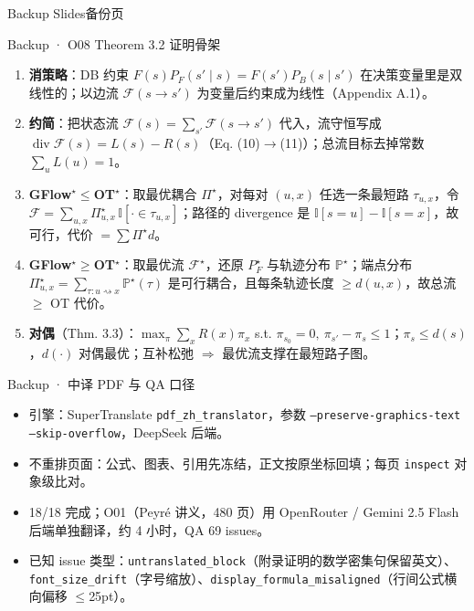 \appendix
\begin{frame}{Backup Slides}\centering\Large 备份页\end{frame}
\begin{frame}{Backup · O08 Theorem 3.2 证明骨架}
\small
\begin{enumerate}
\item \textbf{消策略}：DB 约束 $F(s)P_F(s'\mid s)=F(s')P_B(s\mid s')$ 在决策变量里是双线性的；以边流 $\mathcal F(s\to s')$ 为变量后约束成为线性（Appendix A.1）。
\item \textbf{约简}：把状态流 $\mathcal F(s)=\sum_{s'}\mathcal F(s\to s')$ 代入，流守恒写成 $\operatorname{div}\mathcal F(s)=L(s)-R(s)$（Eq. (10)$\to$(11)）；总流目标去掉常数 $\sum_u L(u)=1$。
\item \textbf{GFlow$^\star\le$OT$^\star$}：取最优耦合 $\Pi^\star$，对每对 $(u,x)$ 任选一条最短路 $\tau_{u,x}$，令 $\mathcal F=\sum_{u,x}\Pi^\star_{u,x}\,\mathbb I[\cdot\in\tau_{u,x}]$；路径的 divergence 是 $\mathbb I[s=u]-\mathbb I[s=x]$，故可行，代价 $=\sum\Pi^\star d$。
\item \textbf{GFlow$^\star\ge$OT$^\star$}：取最优流 $\mathcal F^\star$，还原 $P_F^\star$ 与轨迹分布 $\mathbb P^\star$；端点分布 $\Pi^\star_{u,x}=\sum_{\tau:u\rightsquigarrow x}\mathbb P^\star(\tau)$ 是可行耦合，且每条轨迹长度 $\ge d(u,x)$，故总流 $\ge$ OT 代价。
\item \textbf{对偶}（Thm. 3.3）：$\max_\pi\sum_x R(x)\pi_x$ s.t. $\pi_{s_0}=0,\ \pi_{s'}-\pi_s\le1$；$\pi_s\le d(s)$，$d(\cdot)$ 对偶最优；互补松弛 $\Rightarrow$ 最优流支撑在最短路子图。
\end{enumerate}
\end{frame}
\begin{frame}{Backup · 中译 PDF 与 QA 口径}
\small
\begin{itemize}
\item 引擎：SuperTranslate \texttt{pdf\_zh\_translator}，参数 \texttt{--preserve-graphics-text --skip-overflow}，DeepSeek 后端。
\item 不重排页面：公式、图表、引用先冻结，正文按原坐标回填；每页 \texttt{inspect} 对象级比对。
\item 18/18 完成；O01（Peyr\'e 讲义，480 页）用 OpenRouter / Gemini 2.5 Flash 后端单独翻译，约 4 小时，QA 69 issues。
\item 已知 issue 类型：\texttt{untranslated\_block}（附录证明的数学密集句保留英文）、\texttt{font\_size\_drift}（字号缩放）、\texttt{display\_formula\_misaligned}（行间公式横向偏移 $\le$25pt）。
\end{itemize}
\end{frame}
